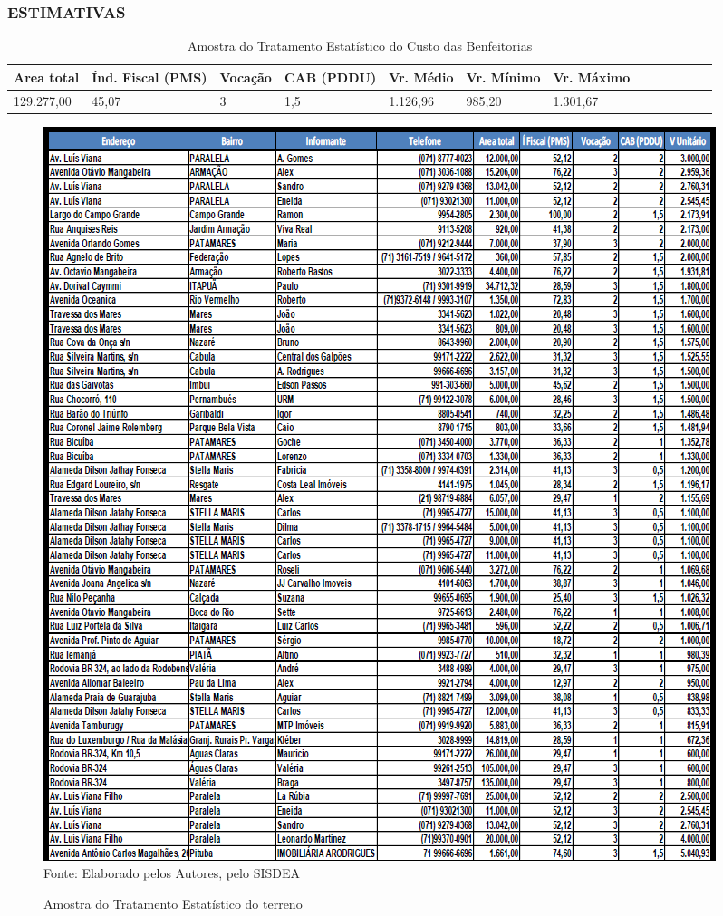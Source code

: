 \subsubsection{ESTIMATIVAS}

\begin{table}[ht]
	\centering
	\begin{threeparttable}
		\caption{Amostra do Tratamento Estatístico do Custo das Benfeitorias }
		\label{Tabela-e1}
		\begin{tabular}{lp{2.0cm} lp{2.5cm} l p{1.0cm}l p{2.5cm}lp{2.0cm} lp{1.5cm} l}
			\toprule
			Area total &	Índ. Fiscal (PMS)	&Vocação &CAB (PDDU)&	Vr. Médio&	Vr. Mínimo&	Vr. Máximo\\\midrule
			129.277,00&	45,07&	3&	1,5	&1.126,96&	985,20&	1.301,67\\ \bottomrule
		\end{tabular}%
		\begin{tablenotes}
			\item [{\normalsize Fonte:     Elaborado pelos Autores (2025)}]  
		\end{tablenotes}
	\end{threeparttable}
\end{table}

\begin{figure}[H]
	\centering  \small 		\caption{ Amostra do Tratamento Estatístico do terreno}
	\includegraphics[width=0.947\linewidth]{figura/screenshot037}
	\label{fig:screenshot037}\\{ Fonte: Elaborado pelos Autores, pelo SISDEA}
\end{figure}

